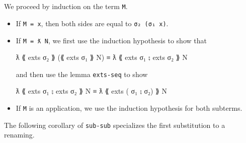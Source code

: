 \begin{fence}
\begin{code}
\AgdaSpace{}%
\<%
\\
%
\>[3]\<%
\\
\>[0]\AgdaSpace{}%
\AgdaSymbol{\{}\AgdaSpace{}%
\AgdaSymbol{=}\AgdaSpace{}%
\AgdaSpace{}%
\AgdaSpace{}%
\AgdaSymbol{\}}\AgdaSpace{}%
\AgdaSymbol{=}\AgdaSpace{}%
\AgdaSpace{}%
\AgdaSpace{}%
\AgdaSymbol{(}\AgdaSymbol{\{}\AgdaSpace{}%
\AgdaSymbol{=}\AgdaSpace{}%
\AgdaSymbol{\})}\AgdaSpace{}%
\AgdaSymbol{(}\AgdaSymbol{\{}\AgdaSpace{}%
\AgdaSymbol{=}\AgdaSpace{}%
\AgdaSymbol{\})}\<%
\end{code}
\end{fence}

We proceed by induction on the term \texttt{M}.

\begin{itemize}
\item
  If \texttt{M\ =\ x}, then both sides are equal to
  \texttt{σ₂\ (σ₁\ x)}.
\item
  If \texttt{M\ =\ ƛ\ N}, we first use the induction hypothesis to show
  that

  \begin{myDisplay}
    ƛ ⟪ exts σ₂ ⟫ (⟪ exts σ₁ ⟫ N) ≡ ƛ ⟪ exts σ₁ ⨟ exts σ₂ ⟫ N
  \end{myDisplay}

  and then use the lemma \texttt{exts-seq} to show

  \begin{myDisplay}
    ƛ ⟪ exts σ₁ ⨟ exts σ₂ ⟫ N ≡ ƛ ⟪ exts ( σ₁ ⨟ σ₂) ⟫ N
  \end{myDisplay}
\item
  If \texttt{M} is an application, we use the induction hypothesis for
  both subterms.
\end{itemize}

The following corollary of \texttt{sub-sub} specializes the first
substitution to a renaming.


